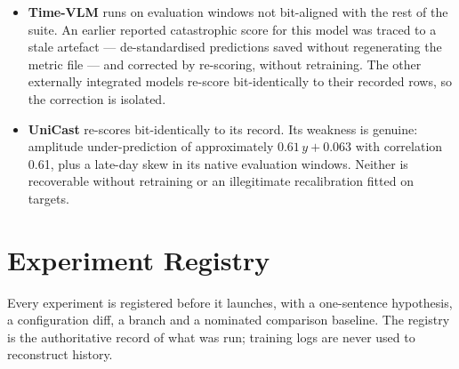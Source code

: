 \begin{itemize}
    other model; no external weather service is consulted.
  \item \textbf{Time-VLM} runs on evaluation windows not bit-aligned with the rest of the
    suite. An earlier reported catastrophic score for this model was traced to a stale
    artefact --- de-standardised predictions saved without regenerating the metric file ---
    and corrected by re-scoring, without retraining. The other externally integrated models
    re-score bit-identically to their recorded rows, so the correction is isolated.
  \item \textbf{UniCast} re-scores bit-identically to its record. Its weakness is genuine:
    amplitude under-prediction of approximately $0.61\,y + 0.063$ with correlation 0.61, plus
    a late-day skew in its native evaluation windows. Neither is recoverable without
    retraining or an illegitimate recalibration fitted on targets.
\end{itemize}


\chapter{Experiment Registry}
\label{app:registry}

Every experiment is registered before it launches, with a one-sentence hypothesis, a
configuration diff, a branch and a nominated comparison baseline. The registry is the
authoritative record of what was run; training logs are never used to reconstruct history.

